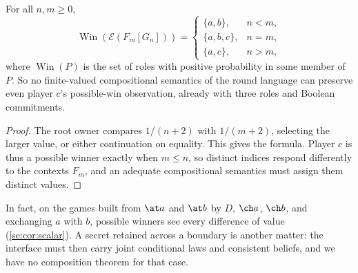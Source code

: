 \begin{theorem}\label{se:thm:infinite}
For all $n,m\geq0$,
\[
 \operatorname{Win}(\mathcal E(F_m[G_n]))=
 \begin{cases}
 \{a,b\},&n<m,\\
 \{a,b,c\},&n=m,\\
 \{a,c\},&n>m,
 \end{cases}
\]
where $\operatorname{Win}(P)$ is the set of roles with positive probability in some member of $P$. So no finite-valued compositional semantics of the round language can preserve even player $c$'s possible-win observation, already with three roles and Boolean commitments.
\end{theorem}
\begin{proof}
The root owner compares $1/(n+2)$ with $1/(m+2)$, selecting the larger value, or either continuation on equality. This gives the formula. Player $c$ is thus a possible winner exactly when $m\leq n$, so distinct indices respond differently to the contexts $F_m$, and an adequate compositional semantics must assign them distinct values.
\end{proof}

In fact, on the games built from $\at a$ and $\at b$ by $D$, $\ch a$, $\ch b$, and exchanging $a$ with $b$, possible winners see every difference of value (\cref{se:cor:scalar}). A secret retained across a boundary is another matter: the interface must then carry joint conditional laws and consistent beliefs, and we have no composition theorem for that case.
